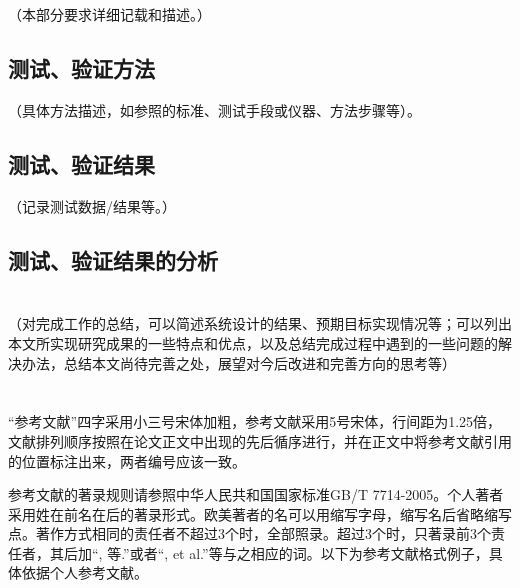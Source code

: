 
\cleardoublepage
\section{} %
\label{sec:系统测试、验证与结果分析}
	（本部分要求详细记载和描述。）
	\subsection{测试、验证方法} %
	\label{sub:测试、验证方法}
		（具体方法描述，如参照的标准、测试手段或仪器、方法步骤等）。
	\newpage

	\subsection{测试、验证结果} %
	\label{sub:测试、验证结果}
		（记录测试数据/结果等。）
	\newpage

	\subsection{测试、验证结果的分析} %
	\label{sub:测试_验证结果的分析}
	

\cleardoublepage
\section{} %
\label{sec:结论}
	（对完成工作的总结，可以简述系统设计的结果、预期目标实现情况等；可以列出本文所实现研究成果的一些特点和优点，以及总结完成过程中遇到的一些问题的解决办法，总结本文尚待完善之处，展望对今后改进和完善方向的思考等）

\cleardoublepage
\section*{} %
\label{sec:参考文献}
	“参考文献”四字采用小三号宋体加粗，参考文献采用5号宋体，行间距为1.25倍，文献排列顺序按照在论文正文中出现的先后循序进行，并在正文中将参考文献引用的位置标注出来，两者编号应该一致。

	参考文献的著录规则请参照中华人民共和国国家标准GB/T 7714-2005。个人著者采用姓在前名在后的著录形式。欧美著者的名可以用缩写字母，缩写名后省略缩写点。著作方式相同的责任者不超过3个时，全部照录。超过3个时，只著录前3个责任者，其后加“, 等.”或者“, et al.”等与之相应的词。以下为参考文献格式例子，具体依据个人参考文献。

	\begingroup
	    \setlength{\bibsep}{0pt}
	\endgroup

\cleardoublepage
\section*{} %
\label{sec:附件}
